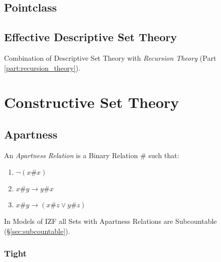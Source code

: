 \subsection{Pointclass}\label{sec:pointclass}

\subsection{Effective Descriptive Set Theory}
\label{sec:effective_descriptive}

Combination of Descriptive Set Theory with \emph{Recursion Theory}
(Part \ref{part:recursion_theory}).



\section{Constructive Set Theory}\label{sec:constructive_set_theory}

\subsection{Apartness}\label{sec:apartness}

An \emph{Apartness Relation} is a Binary Relation $\#$ such that:

\begin{enumerate}
\item $\neg (x\#x)$
\item $x\#y \rightarrow y\#x$
\item $x\#y \rightarrow (x\#z \vee y\#z)$
\end{enumerate}

In Models of IZF all Sets with Apartness Relations are Subcountable
(\S\ref{sec:subcountable}).



\subsubsection{Tight}\label{sec:tight}

